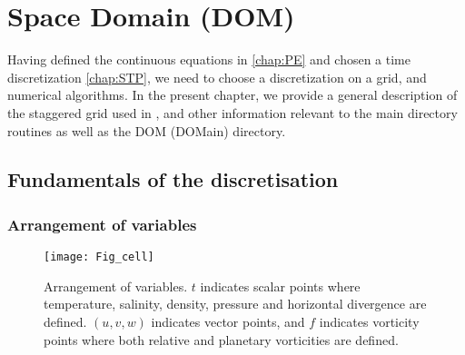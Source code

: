 \documentclass[../main/NEMO_manual]{subfiles}
\begin{document}
\chapter{Space Domain (DOM)}
\label{chap:DOM}

\minitoc


\newpage

Having defined the continuous equations in \autoref{chap:PE} and chosen a time discretization \autoref{chap:STP},
we need to choose a discretization on a grid, and numerical algorithms.
In the present chapter, we provide a general description of the staggered grid used in \NEMO,
and other information relevant to the main directory routines as well as the DOM (DOMain) directory.

\section{Fundamentals of the discretisation}
\label{sec:DOM_basics}

\subsection{Arrangement of variables}
\label{subsec:DOM_cell}

\begin{figure}[!tb]
  \begin{center}
    \texttt{[image: Fig\_cell]}
    \caption{
      \protect\label{fig:cell}
      Arrangement of variables.
      $t$ indicates scalar points where temperature, salinity, density, pressure and
      horizontal divergence are defined.
      $(u,v,w)$ indicates vector points, and $f$ indicates vorticity points where both relative and
      planetary vorticities are defined.
    }
  \end{center}
\end{figure}
\end{document}
